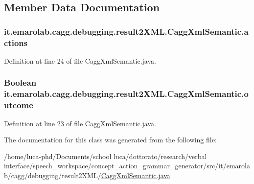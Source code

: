 \subsection{Member Data Documentation}
\hypertarget{classit_1_1emarolab_1_1cagg_1_1debugging_1_1result2XML_1_1CaggXmlSemantic_a79e4759e07091f9483b393576c6c8d3b}{
\subsubsection[{actions}]{ it.\-emarolab.\-cagg.\-debugging.\-result2\-X\-M\-L.\-Cagg\-Xml\-Semantic.\-actions\hspace{0.3cm}{\ttfamily [private]}}}\label{classit_1_1emarolab_1_1cagg_1_1debugging_1_1result2XML_1_1CaggXmlSemantic_a79e4759e07091f9483b393576c6c8d3b}


Definition at line 24 of file Cagg\-Xml\-Semantic.\-java.

\hypertarget{classit_1_1emarolab_1_1cagg_1_1debugging_1_1result2XML_1_1CaggXmlSemantic_a30183b3c5d7fc23d9c782beac9d86f87}{
\subsubsection[{outcome}]{\setlength{\rightskip}{0pt plus 5cm}Boolean it.\-emarolab.\-cagg.\-debugging.\-result2\-X\-M\-L.\-Cagg\-Xml\-Semantic.\-outcome\hspace{0.3cm}{\ttfamily [private]}}}\label{classit_1_1emarolab_1_1cagg_1_1debugging_1_1result2XML_1_1CaggXmlSemantic_a30183b3c5d7fc23d9c782beac9d86f87}


Definition at line 23 of file Cagg\-Xml\-Semantic.\-java.



The documentation for this class was generated from the following file\-:\begin{DoxyCompactItemize}
\item 
/home/luca-\/phd/\-Documents/school luca/dottorato/research/verbal interface/speech\-\_\-workspace/concept\-\_\-action\-\_\-grammar\-\_\-generator/src/it/emarolab/cagg/debugging/result2\-X\-M\-L/\hyperlink{CaggXmlSemantic_8java}{Cagg\-Xml\-Semantic.\-java}\end{DoxyCompactItemize}
